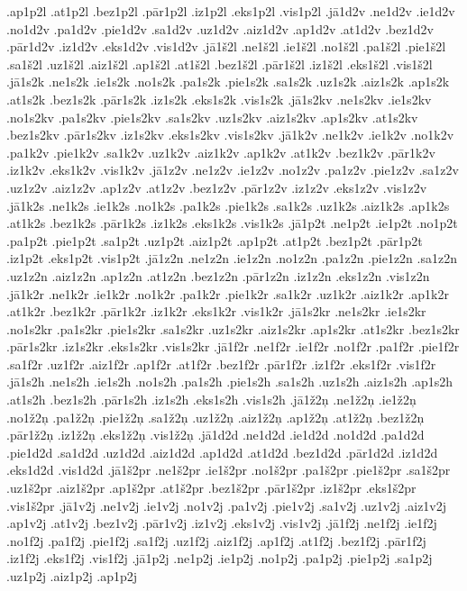 {.ap1p2l
.at1p2l
.bez1p2l
.pār1p2l
.iz1p2l
.eks1p2l
.vis1p2l
.jā1d2v
.ne1d2v
.ie1d2v
.no1d2v
.pa1d2v
.pie1d2v
.sa1d2v
.uz1d2v
.aiz1d2v
.ap1d2v
.at1d2v
.bez1d2v
.pār1d2v
.iz1d2v
.eks1d2v
.vis1d2v
.jā1š2l
.ne1š2l
.ie1š2l
.no1š2l
.pa1š2l
.pie1š2l
.sa1š2l
.uz1š2l
.aiz1š2l
.ap1š2l
.at1š2l
.bez1š2l
.pār1š2l
.iz1š2l
.eks1š2l
.vis1š2l
.jā1s2k
.ne1s2k
.ie1s2k
.no1s2k
.pa1s2k
.pie1s2k
.sa1s2k
.uz1s2k
.aiz1s2k
.ap1s2k
.at1s2k
.bez1s2k
.pār1s2k
.iz1s2k
.eks1s2k
.vis1s2k
.jā1s2kv
.ne1s2kv
.ie1s2kv
.no1s2kv
.pa1s2kv
.pie1s2kv
.sa1s2kv
.uz1s2kv
.aiz1s2kv
.ap1s2kv
.at1s2kv
.bez1s2kv
.pār1s2kv
.iz1s2kv
.eks1s2kv
.vis1s2kv
.jā1k2v
.ne1k2v
.ie1k2v
.no1k2v
.pa1k2v
.pie1k2v
.sa1k2v
.uz1k2v
.aiz1k2v
.ap1k2v
.at1k2v
.bez1k2v
.pār1k2v
.iz1k2v
.eks1k2v
.vis1k2v
.jā1z2v
.ne1z2v
.ie1z2v
.no1z2v
.pa1z2v
.pie1z2v
.sa1z2v
.uz1z2v
.aiz1z2v
.ap1z2v
.at1z2v
.bez1z2v
.pār1z2v
.iz1z2v
.eks1z2v
.vis1z2v
.jā1k2s
.ne1k2s
.ie1k2s
.no1k2s
.pa1k2s
.pie1k2s
.sa1k2s
.uz1k2s
.aiz1k2s
.ap1k2s
.at1k2s
.bez1k2s
.pār1k2s
.iz1k2s
.eks1k2s
.vis1k2s
.jā1p2t
.ne1p2t
.ie1p2t
.no1p2t
.pa1p2t
.pie1p2t
.sa1p2t
.uz1p2t
.aiz1p2t
.ap1p2t
.at1p2t
.bez1p2t
.pār1p2t
.iz1p2t
.eks1p2t
.vis1p2t
.jā1z2n
.ne1z2n
.ie1z2n
.no1z2n
.pa1z2n
.pie1z2n
.sa1z2n
.uz1z2n
.aiz1z2n
.ap1z2n
.at1z2n
.bez1z2n
.pār1z2n
.iz1z2n
.eks1z2n
.vis1z2n
.jā1k2r
.ne1k2r
.ie1k2r
.no1k2r
.pa1k2r
.pie1k2r
.sa1k2r
.uz1k2r
.aiz1k2r
.ap1k2r
.at1k2r
.bez1k2r
.pār1k2r
.iz1k2r
.eks1k2r
.vis1k2r
.jā1s2kr
.ne1s2kr
.ie1s2kr
.no1s2kr
.pa1s2kr
.pie1s2kr
.sa1s2kr
.uz1s2kr
.aiz1s2kr
.ap1s2kr
.at1s2kr
.bez1s2kr
.pār1s2kr
.iz1s2kr
.eks1s2kr
.vis1s2kr
.jā1f2r
.ne1f2r
.ie1f2r
.no1f2r
.pa1f2r
.pie1f2r
.sa1f2r
.uz1f2r
.aiz1f2r
.ap1f2r
.at1f2r
.bez1f2r
.pār1f2r
.iz1f2r
.eks1f2r
.vis1f2r
.jā1s2h
.ne1s2h
.ie1s2h
.no1s2h
.pa1s2h
.pie1s2h
.sa1s2h
.uz1s2h
.aiz1s2h
.ap1s2h
.at1s2h
.bez1s2h
.pār1s2h
.iz1s2h
.eks1s2h
.vis1s2h
.jā1ž2ņ
.ne1ž2ņ
.ie1ž2ņ
.no1ž2ņ
.pa1ž2ņ
.pie1ž2ņ
.sa1ž2ņ
.uz1ž2ņ
.aiz1ž2ņ
.ap1ž2ņ
.at1ž2ņ
.bez1ž2ņ
.pār1ž2ņ
.iz1ž2ņ
.eks1ž2ņ
.vis1ž2ņ
.jā1d2d
.ne1d2d
.ie1d2d
.no1d2d
.pa1d2d
.pie1d2d
.sa1d2d
.uz1d2d
.aiz1d2d
.ap1d2d
.at1d2d
.bez1d2d
.pār1d2d
.iz1d2d
.eks1d2d
.vis1d2d
.jā1š2pr
.ne1š2pr
.ie1š2pr
.no1š2pr
.pa1š2pr
.pie1š2pr
.sa1š2pr
.uz1š2pr
.aiz1š2pr
.ap1š2pr
.at1š2pr
.bez1š2pr
.pār1š2pr
.iz1š2pr
.eks1š2pr
.vis1š2pr
.jā1v2j
.ne1v2j
.ie1v2j
.no1v2j
.pa1v2j
.pie1v2j
.sa1v2j
.uz1v2j
.aiz1v2j
.ap1v2j
.at1v2j
.bez1v2j
.pār1v2j
.iz1v2j
.eks1v2j
.vis1v2j
.jā1f2j
.ne1f2j
.ie1f2j
.no1f2j
.pa1f2j
.pie1f2j
.sa1f2j
.uz1f2j
.aiz1f2j
.ap1f2j
.at1f2j
.bez1f2j
.pār1f2j
.iz1f2j
.eks1f2j
.vis1f2j
.jā1p2j
.ne1p2j
.ie1p2j
.no1p2j
.pa1p2j
.pie1p2j
.sa1p2j
.uz1p2j
.aiz1p2j
.ap1p2j
}

